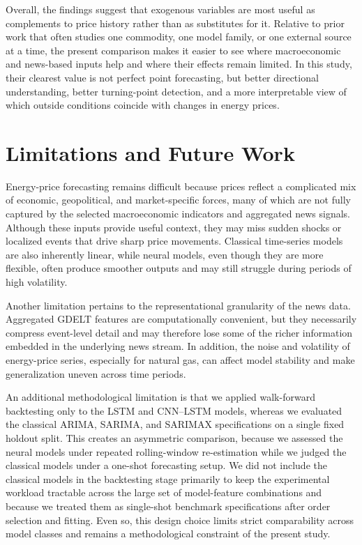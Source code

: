 \documentclass[pdflatex,sn-mathphys-num]{sn-jnl}%
\theoremstyle{thmstyleone}%
\theoremstyle{thmstyletwo}%
\theoremstyle{thmstylethree}%
\begin{document}
Overall, the findings suggest that exogenous variables are most useful as complements to price history rather than as substitutes for it. Relative to prior work that often studies one commodity, one model family, or one external source at a time, the present comparison makes it easier to see where macroeconomic and news-based inputs help and where their effects remain limited. In this study, their clearest value is not perfect point forecasting, but better directional understanding, better turning-point detection, and a more interpretable view of which outside conditions coincide with changes in energy prices.

\section{Limitations and Future Work}\label{sec14}

Energy-price forecasting remains difficult because prices reflect a complicated mix of economic, geopolitical, and market-specific forces, many of which are not fully captured by the selected macroeconomic indicators and aggregated news signals. Although these inputs provide useful context, they may miss sudden shocks or localized events that drive sharp price movements. Classical time-series models are also inherently linear, while neural models, even though they are more flexible, often produce smoother outputs and may still struggle during periods of high volatility.

Another limitation pertains to the representational granularity of the news data. Aggregated GDELT features are computationally convenient, but they necessarily compress event-level detail and may therefore lose some of the richer information embedded in the underlying news stream. In addition, the noise and volatility of energy-price series, especially for natural gas, can affect model stability and make generalization uneven across time periods.

An additional methodological limitation is that we applied walk-forward backtesting only to the LSTM and CNN--LSTM models, whereas we evaluated the classical ARIMA, SARIMA, and SARIMAX specifications on a single fixed holdout split. This creates an asymmetric comparison, because we assessed the neural models under repeated rolling-window re-estimation while we judged the classical models under a one-shot forecasting setup. We did not include the classical models in the backtesting stage primarily to keep the experimental workload tractable across the large set of model-feature combinations and because we treated them as single-shot benchmark specifications after order selection and fitting. Even so, this design choice limits strict comparability across model classes and remains a methodological constraint of the present study.
\end{document}
